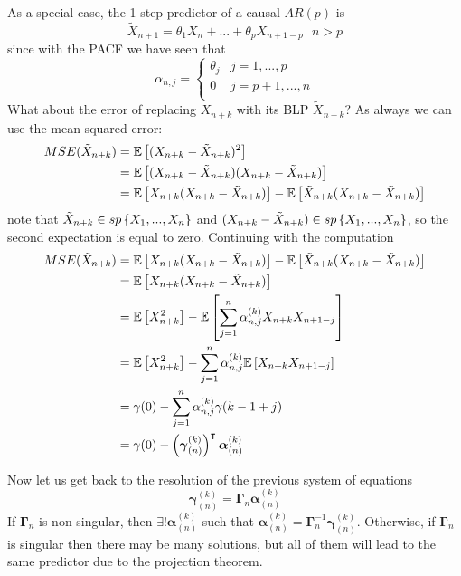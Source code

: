 As a special case, the 1-step predictor of a causal $AR(p)$ is
\[
    \tilde{X}_{n+1}=\theta_1X_n+...+\theta_pX_{n+1-p}\ \ \ n>p
\]
since with the PACF we have seen that
\[
    \alpha_{n,j}=\begin{cases}
        \theta_j&j=1,...,p\\
        0&j=p+1,...,n\\
    \end{cases}
\]
What about the error of replacing $X_{n+k}$ with its BLP $\tilde{X}_{n+k}$? As always we can use the mean squared error:
\begin{equation*}
    \begin{split}
        MSE(\tilde{X}_{n+k})&=\mathbb{E}\left[(X_{n+k}-\tilde{X}_{n+k})^2\right]\\
        &=\mathbb{E}\left[(X_{n+k}-\tilde{X}_{n+k})(X_{n+k}-\tilde{X}_{n+k})\right]\\
        &=\mathbb{E}\left[X_{n+k}(X_{n+k}-\tilde{X}_{n+k})\right]-\mathbb{E}\left[\tilde{X}_{n+k}(X_{n+k}-\tilde{X}_{n+k})\right]\\
    \end{split}
\end{equation*}
note that $\tilde{X}_{n+k}\in\bar{sp}\left\{X_1,...,X_n\right\}$ and $(X_{n+k}-\tilde{X}_{n+k})\in\bar{sp}\left\{X_1,...,X_n\right\}$, so the second expectation is equal to zero. Continuing with the computation
\begin{equation*}
    \begin{split}
        MSE(\tilde{X}_{n+k})&=\mathbb{E}\left[X_{n+k}(X_{n+k}-\tilde{X}_{n+k})\right]-\mathbb{E}\left[\tilde{X}_{n+k}(X_{n+k}-\tilde{X}_{n+k})\right]\\
        &=\mathbb{E}\left[X_{n+k}(X_{n+k}-\tilde{X}_{n+k})\right]\\
        &=\mathbb{E}\left[X_{n+k}^2\right]-\mathbb{E}\left[\sum_{j=1}^n\alpha_{n,j}^{(k)}X_{n+k}X_{n+1-j}\right]\\
        &=\mathbb{E}\left[X_{n+k}^2\right]-\sum_{j=1}^n\alpha_{n,j}^{(k)}\mathbb{E}\left[X_{n+k}X_{n+1-j}\right]\\
        &=\gamma(0)-\sum_{j=1}^n\alpha_{n,j}^{(k)}\gamma(k-1+j)\\
        &=\gamma(0)-\left(\boldsymbol{\gamma}_{(n)}^{(k)}\right)^\intercal\boldsymbol{\alpha}_{(n)}^{(k)}\\
    \end{split}
\end{equation*}

Now let us get back to the resolution of the previous system of equations
\[
    \boldsymbol{\gamma}_{(n)}^{(k)}=\boldsymbol{\Gamma}_n\boldsymbol{\alpha}_{(n)}^{(k)}
\]
If  $\boldsymbol{\Gamma}_n$ is non-singular, then $\exists!\boldsymbol{\alpha}_{(n)}^{(k)}$ such that $\boldsymbol{\alpha}_{(n)}^{(k)}=\boldsymbol{\Gamma}_n^{-1}\boldsymbol{\gamma}_{(n)}^{(k)}$. Otherwise, if $\boldsymbol{\Gamma}_n$ is singular then there may be many solutions, but all of them will lead to the same predictor due to the projection theorem.

